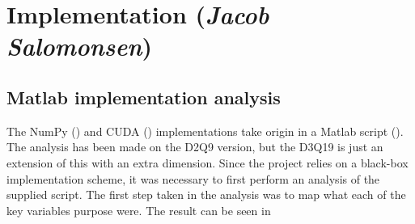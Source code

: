 \section{Implementation (\textit{Jacob Salomonsen})}


\subsection{Matlab implementation analysis}\label{sec:matlabimplementation}
The NumPy () and CUDA () implementations take origin in a Matlab script (). The analysis has been made on the D2Q9 version, but the D3Q19 is just an extension of this with an extra dimension. Since the project relies on a black-box implementation scheme, it was necessary to first perform an analysis of the supplied script. The first step taken in the analysis was to map what each of the key variables purpose were. The result can be seen in 

